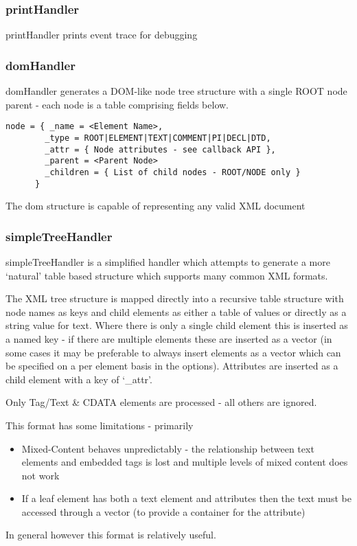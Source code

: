 \documentclass{ltxdoc}
\begin{document}
\subsubsection{printHandler}

printHandler prints event trace for debugging

\subsubsection{domHandler}

domHandler generates a DOM-like node tree  structure with 
a single ROOT node parent - each node is a table comprising 
fields below.

\begin{verbatim}
node = { _name = <Element Name>,
        _type = ROOT|ELEMENT|TEXT|COMMENT|PI|DECL|DTD,
        _attr = { Node attributes - see callback API },
        _parent = <Parent Node>
        _children = { List of child nodes - ROOT/NODE only }
      }

\end{verbatim}
The dom structure is capable of representing any valid XML document
\subsubsection{simpleTreeHandler}

simpleTreeHandler is a simplified handler which attempts to generate a
more `natural' table based structure which supports many common XML
formats.

The XML tree structure is mapped directly into a recursive table
structure with node names as keys and child elements as either a table
of values or directly as a string value for text. Where there is only a
single child element this is inserted as a named key - if there are
multiple elements these are inserted as a vector (in some cases it may
be preferable to always insert elements as a vector which can be
specified on a per element basis in the options). Attributes are
inserted as a child element with a key of `\_attr'.

Only Tag/Text \& CDATA elements are processed - all others are ignored.

This format has some limitations - primarily

\begin{itemize}
\item  Mixed-Content behaves unpredictably - the relationship between text
  elements and embedded tags is lost and multiple levels of mixed
  content does not work
\item  If a leaf element has both a text element and attributes then the text
  must be accessed through a vector (to provide a container for the
  attribute)
\end{itemize}
In general however this format is relatively useful.
\end{document}
